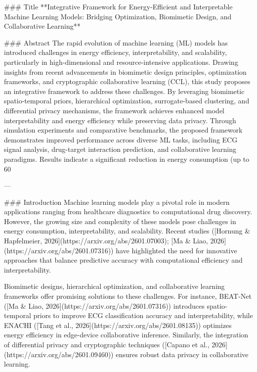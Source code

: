 ### Title  
**Integrative Framework for Energy-Efficient and Interpretable Machine Learning Models: Bridging Optimization, Biomimetic Design, and Collaborative Learning**

### Abstract  
The rapid evolution of machine learning (ML) models has introduced challenges in energy efficiency, interpretability, and scalability, particularly in high-dimensional and resource-intensive applications. Drawing insights from recent advancements in biomimetic design principles, optimization frameworks, and cryptographic collaborative learning (CCL), this study proposes an integrative framework to address these challenges. By leveraging biomimetic spatio-temporal priors, hierarchical optimization, surrogate-based clustering, and differential privacy mechanisms, the framework achieves enhanced model interpretability and energy efficiency while preserving data privacy. Through simulation experiments and comparative benchmarks, the proposed framework demonstrates improved performance across diverse ML tasks, including ECG signal analysis, drug-target interaction prediction, and collaborative learning paradigms. Results indicate a significant reduction in energy consumption (up to 60%

---

### Introduction  
Machine learning models play a pivotal role in modern applications ranging from healthcare diagnostics to computational drug discovery. However, the growing size and complexity of these models pose challenges in energy consumption, interpretability, and scalability. Recent studies ([Hornung & Hapfelmeier, 2026](https://arxiv.org/abs/2601.07003); [Ma & Liao, 2026](https://arxiv.org/abs/2601.07316)) have highlighted the need for innovative approaches that balance predictive accuracy with computational efficiency and interpretability.

Biomimetic designs, hierarchical optimization, and collaborative learning frameworks offer promising solutions to these challenges. For instance, BEAT-Net ([Ma & Liao, 2026](https://arxiv.org/abs/2601.07316)) introduces spatio-temporal priors to improve ECG classification accuracy and interpretability, while ENACHI ([Tang et al., 2026](https://arxiv.org/abs/2601.08135)) optimizes energy efficiency in edge-device collaborative inference. Similarly, the integration of differential privacy and cryptographic techniques ([Capano et al., 2026](https://arxiv.org/abs/2601.09460)) ensures robust data privacy in collaborative learning.

